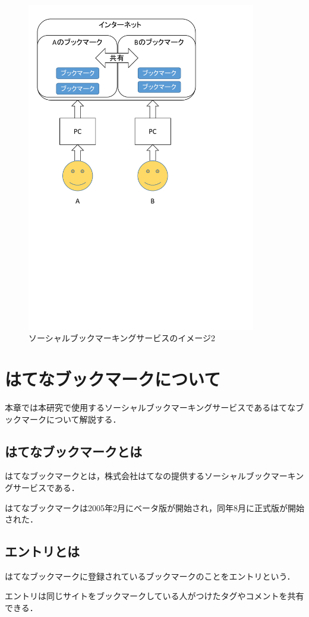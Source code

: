 \begin{figure}[htb]
\centering
\includegraphics[width=10cm]{sbs2.pdf}
\caption{ソーシャルブックマーキングサービスのイメージ2}\label{sbs2}
\end{figure}

\chapter{はてなブックマークについて}
本章では本研究で使用するソーシャルブックマーキングサービスであるはてなブックマークについて解説する．

\section{はてなブックマークとは}
はてなブックマークとは，株式会社はてなの提供するソーシャルブックマーキングサービスである．\par
はてなブックマークは2005年2月にベータ版が開始され，同年8月に正式版が開始された\cite{hatena-history}．\par

\section{エントリとは}
はてなブックマークに登録されているブックマークのことをエントリという．\par
エントリは同じサイトをブックマークしている人がつけたタグやコメントを共有できる．

